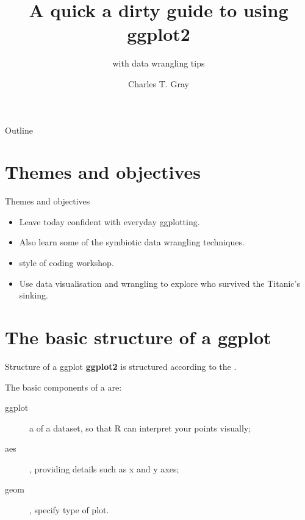 \documentclass{beamer}
\title{A quick a dirty guide to using ggplot2}
\subtitle{with data wrangling tips}
\author{Charles T. Gray}
\institute{La Trobe University}
\begin{document}
\begin{frame}
\maketitle
\end{frame}

\begin{frame}{Outline}
\tableofcontents
\end{frame}

\section{Themes and objectives}
\begin{frame}{Themes and objectives}
\begin{itemize}
\item Leave today confident with everyday ggplotting.
\item Also learn some of the symbiotic data wrangling techniques.
\item {} style of coding workshop.
\item Use data visualisation and wrangling to explore who survived the Titanic's sinking.
\end{itemize}
\end{frame}

\section{The basic structure of a ggplot}
\begin{frame}{Structure of a ggplot}
\textbf{ggplot2} is structured according to the .

\bigskip

The basic components of a  are:
\begin{description}
\item[ggplot]  a  of a dataset, so that R can interpret your points visually;
\item [aes] , providing details such as x and y axes;
\item [geom] , specify type of plot.
\end{description}
\end{frame}
\end{document}
